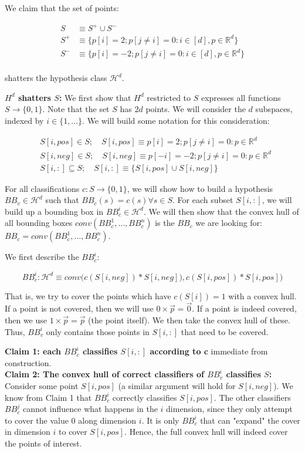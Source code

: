 \documentclass[11pt]{article}
\newcommand{\R}{\ensuremath{\mathbb R}}
\renewcommand{\H}{\ensuremath{\mathcal{H}}}
\begin{document}
We claim that the set of points:

\begin{align*}
S &\equiv S^+ \cup S^- \\
S^+ &\equiv \{ p[i] = 2; p[j \neq i]  = 0 : i \in [d], p \in \R^d \} \\
S^- &\equiv \{ p[i] = -2; p[j \neq i] = 0 : i \in [d], p \in \R^d  \} \\
\end{align*}

shatters the hypothesis class $\H^d$.

\textbf{$H^d$ shatters $S$:}
We first show that $H^d$ restricted to $S$ expresses all functions $S \rightarrow \{0, 1\}$.
Note that the set $S$ has $2d$ points. We will consider the $d$ subspaces,
indexed by $i \in \{1, \dots \}$. We will build some notation for this
consideration:

\begin{align*}
&S[i, pos] \in S; \quad S[i, pos] \equiv p[i] = 2; p[j \neq i] = 0 : p \in \R^d  \\
&S[i, neg] \in S; \quad S[i, neg] \equiv p[-i] = -2; p[j \neq i] = 0 : p \in \R^d \\
&S[i, :] \subseteq S; \quad S[i, :] \equiv \{ S[i, pos] \cup S[i, neg] \}
\end{align*}


For all classifications $c: S \rightarrow \{0, 1\}$, we will show how to build a
hypothesis $BB_v \in \H^d$ such that $BB_c(s) = c(s) \forall s \in S$.
For each subset $S[i, :]$, we will build up a bounding box in $BB_c^i \in \H^d$.
We will then show that the convex hull of
all bounding boxes $conv(BB_c^1, \dots, BB_c^n)$ is the $BB_c$ we are looking for:
$BB_c = conv(BB_c^1, \dots, BB_c^n)$.

We first describe the $BB_c^i$:

$$
BB_c^i : \H^d \equiv conv\bigg(c(S[i, neg]) * S[i, neg]), c(S[i, pos]) * S[i, pos]\bigg) 
$$

That is, we try to cover the points which have $c(S[i]) = 1$ with a
convex hull. If a point is
not covered, then we will use $0 \times \vec p = \vec 0$. If a point is
indeed covered, then we use $1 \times \vec p = \vec p$ (the point itself). We then
take the convex hull of these. Thus, $BB_v^i$ only contains those
points in $S[i, :]$ that need to be covered.

\textbf{Claim 1: each $BB_c^i$ classifies $S[i, :]$ according to c} immediate from construction. \\
\textbf{Claim 2: The convex hull of correct classifiers of $BB_v^i$ classifies $S$:}
Consider some point $S[i, pos]$ (a similar argument will hold for $S[i, neg]$).
We know from Claim 1 that $BB_c^i$ correctly classifies $S[i, pos]$. The
other classifiers $BB_c^j$ cannot influence what happens in the $i$ dimension,
since they only attempt to cover the value $0$ along dimension $i$.
It is only $BB_c^i$ that can "expand" the cover in dimension $i$ to cover
$S[i, pos]$. Hence, the full convex hull will indeed cover the points of
interest.
\end{document}
